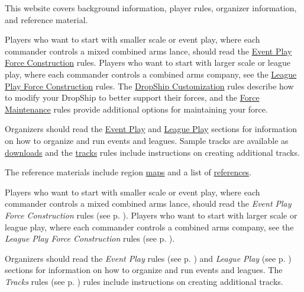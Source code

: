  {
This website covers background information, player rules, organizer information, and reference material.

Players who want to start with smaller scale or event play, where each commander controls a mixed combined arms lance, should read the \hyperref[subsec:force_construction_scale_1]{Event Play Force Construction} rules.
Players who want to start with larger scale or league play, where each commander controls a combined arms company, see the \hyperref[subsec:force_construction_scale_2]{League Play Force Construction} rules.
The \hyperref[sec:dropship_customization]{DropShip Customization} rules describe how to modify your DropShip to better support their forces, and the \hyperref[sec:force_maintenance]{Force Maintenance} rules provide additional options for maintaining your force.

Organizers should read the \hyperref[sec:event_play]{Event Play} and \hyperref[sec:league_play]{League Play} sections for information on how to organize and run events and leagues.
Sample tracks are available as \hyperref[sec:downloads]{downloads} and the \hyperref[sec:tracks]{tracks} rules include instructions on creating additional tracks.

The reference materials include region \hyperref[sec:outworlds_wastes_map]{maps} and a list of \hyperref[sec:references]{references}.
} {
Players who want to start with smaller scale or event play, where each commander controls a mixed combined arms lance, should read the \emph{Event Play Force Construction} rules (see p. \pageref{subsec:force_construction_scale_1}).
Players who want to start with larger scale or league play, where each commander controls a combined arms company, see the \emph{League Play Force Construction} rules (see p. \pageref{subsec:force_construction_scale_2}).

Organizers should read the \emph{Event Play} rules (see p. \pageref{sec:event_play}) and \emph{League Play} (see p. \pageref{sec:league_play}) sections for information on how to organize and run events and leagues.
The \emph{Tracks} rules (see p. \pageref{sec:tracks}) rules include instructions on creating additional tracks.
}
